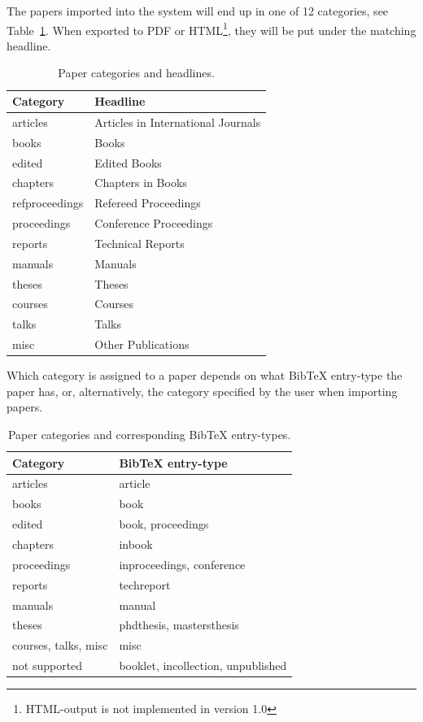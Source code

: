 The papers imported into the system will end up in one of 12 categories, see
Table~\ref{tab:categories}. When exported to PDF or
HTML\footnote{HTML-output is not implemented in version 1.0}, they will
be put under the matching headline.

\begin{table}[htbp]
  \begin{center}
    \begin{tabular}{|l|l|}
      \hline
      \textbf{Category} & \textbf{Headline}\\
      \hline
      \hline
      articles & Articles in International Journals\\
      books & Books\\
      edited & Edited Books\\
      chapters & Chapters in Books\\
      refproceedings & Refereed Proceedings\\
      proceedings & Conference Proceedings\\
      reports & Technical Reports\\
      manuals & Manuals\\
      theses & Theses\\
      courses & Courses\\
      talks & Talks\\
      misc & Other Publications\\
      \hline
    \end{tabular}
    \caption{Paper categories and headlines.}
    \label{tab:categories}
  \end{center}
\end{table}

Which category is assigned to a paper depends on what BibTeX
entry-type the paper has, or, alternatively,
the category specified by the user when importing papers.

\begin{table}[htbp]
  \begin{center}
    \begin{tabular}{|l|l|}
      \hline
      \textbf{Category} & \textbf{BibTeX entry-type}\\
      \hline
      \hline
      articles & article\\
      books & book\\
      edited & book, proceedings\\
      chapters & inbook\\
      proceedings & inproceedings, conference\\
      reports & techreport\\
      manuals & manual\\
      theses & phdthesis, mastersthesis\\
      courses, talks, misc & misc\\
      not supported & booklet, incollection, unpublished\\
      \hline
    \end{tabular}
    \caption{Paper categories and corresponding BibTeX entry-types.}
    \label{tab:entrytypes}
  \end{center}
\end{table}

